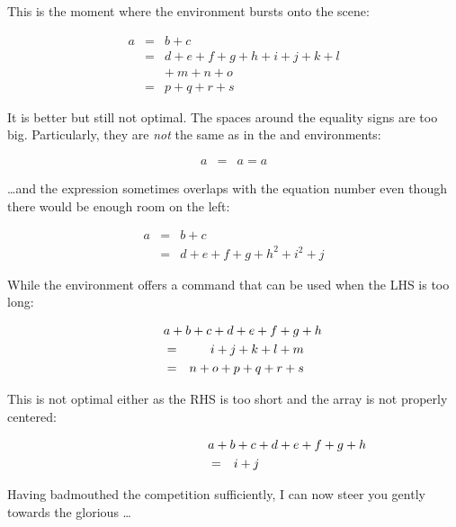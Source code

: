 This is the moment where the  environment bursts onto the scene:
\begin{example}
\begin{eqnarray}
  a & = & b + c \\
  & = & d + e + f + g + h + i 
  + j + k + l \nonumber \\
  && +\: m + n + o \\
  & = & p + q + r + s
\end{eqnarray}
\end{example}

It is better but still not optimal. The spaces around the equality signs are too big.
Particularly, they are \emph{not} the same as in the
 and  environments:
\begin{example}
\begin{eqnarray}
  a & = & a = a
\end{eqnarray}
\end{example}

\noindent \ldots and the expression sometimes overlaps with the equation number even
though there would be enough room on the left:
\begin{example}
\begin{eqnarray}
  a & = & b + c 
  \\
  & = & d + e + f + g + h^2 
  + i^2 + j 
  \label{eq:faultyeqnarray}
\end{eqnarray}
\end{example}

\noindent While the environment offers a command  that can
be used when the LHS is too long:
\begin{example}
\begin{eqnarray}
  \lefteqn{a + b + c + d 
    + e + f + g + h}\nonumber\\
  & = & i + j + k + l + m 
  \\
  & = & n + o + p + q + r + s
\end{eqnarray}
\end{example}
\noindent This is not optimal either as the RHS is too short and the array is
not properly centered:
\begin{example}
\begin{eqnarray}
  \lefteqn{a + b + c + d 
    + e + f + g + h} 
  \nonumber \\
  & = & i + j 
\end{eqnarray}
\end{example}

\noindent Having badmouthed the competition sufficiently, I can now steer you gently towards the glorious \ldots

